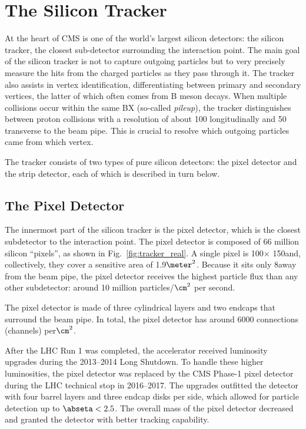 \section{The Silicon Tracker}
\label{sec:tracker}
At the heart of CMS is one of the world's largest silicon detectors: the silicon tracker, the closest sub-detector surrounding the interaction point.
The main goal of the silicon tracker is not to capture outgoing particles but to very precisely measure the hits from the charged particles as they pass through it.
The tracker also assists in vertex identification, differentiating between primary and secondary vertices, the latter of which often comes from B meson decays.
When multiple \pp collisions occur within the same BX (so-called \emph{pileup}), the tracker distinguishes between proton collisions with a resolution of about 100 \mum longitudinally and 50 \mum transverse to the beam pipe.
This is crucial to resolve which outgoing particles came from which \pp vertex.

The tracker consists of two types of pure silicon detectors: the pixel detector and the strip detector, each of which is described in turn below.


\subsection{The Pixel Detector}
\label{sec:pixel}

The innermost part of the silicon tracker is the pixel detector, which is the closest subdetector to the interaction point.
The pixel detector is composed of 66 million silicon ``pixels'', as shown in Fig.~\ref{fig:tracker_real}.
A single pixel is 100\mum $\times$ 150\mum and, collectively, they cover a sensitive area of 1.9$\meter^2$.
Because it sits only 8\cm away from the beam pipe, the pixel detector receives the highest particle flux than any other subdetector:
around 10 million particles/$\cm^2$ per second.

The pixel detector is made of three cylindrical layers and two endcaps that surround the beam pipe.
In total, the pixel detector has around 6000 connections (channels) per$\cm^2$.

After the LHC Run 1 was completed, the accelerator received luminosity upgrades during the 2013--2014 Long Shutdown.
To handle these higher luminosities, the pixel detector was replaced by the CMS Phase-1 pixel detector during the LHC technical stop in 2016--2017.
The upgrades outfitted the detector with four barrel layers and three endcap disks per side, which allowed for particle detection up to $\abseta < 2.5$.
The overall mass of the pixel detector decreased and granted the detector with better tracking capability.

